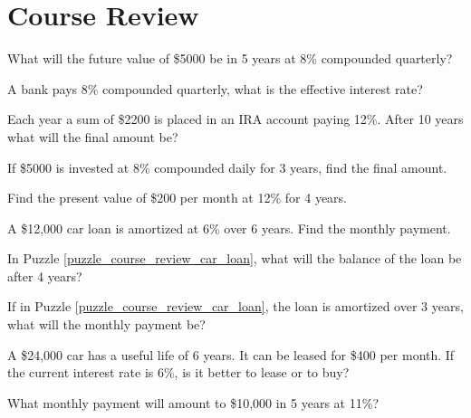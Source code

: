 \chapter{Course Review}

\begin{puzzle}
    What will the future value of \$5000 be in 5 years at 8\% compounded quarterly?
\end{puzzle}

\begin{puzzle}
    A bank pays 8\% compounded quarterly, what is the effective interest rate?
\end{puzzle}

\begin{puzzle}
    Each year a sum of \$2200 is placed in an IRA account paying 12\%. After 10 years what will the final amount be?
\end{puzzle}

\begin{puzzle}
    If \$5000 is invested at 8\% compounded daily for 3 years, find the final amount.
\end{puzzle}

\begin{puzzle}
    Find the present value of \$200 per month at 12\% for 4 years.
\end{puzzle}

\begin{puzzle}\label{puzzle_course_review_car_loan}
    A \$12,000 car loan is amortized at 6\% over 6 years. Find the monthly payment.
\end{puzzle}

\begin{puzzle}
    In Puzzle \ref{puzzle_course_review_car_loan}, what will the balance of the loan be after 4 years?
\end{puzzle}

\begin{puzzle}
    If in Puzzle \ref{puzzle_course_review_car_loan}, the loan is amortized over 3 years, what will the monthly payment be?
\end{puzzle}

\begin{puzzle}
    A \$24,000 car has a useful life of 6 years. It can be leased for \$400 per month. If the current interest rate is 6\%, is it better to lease or to buy?
\end{puzzle}

\begin{puzzle}
    What monthly payment will amount to \$10,000 in 5 years at 11\%?
\end{puzzle}

